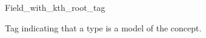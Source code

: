 \begin{ccRefClass}{Field_with_kth_root_tag}
\label{Field_with_kth_root_tag}

\ccDefinition
Tag indicating that a type is a model of the  concept. 


\ccInheritsFrom
{}

\ccIsModel
{}


\ccSeeAlso
{} \\
\\
\end{ccRefClass} 